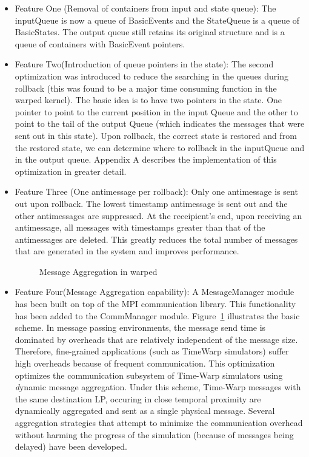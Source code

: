 \documentclass[11pt]{report}
\begin{document}
\begin{itemize}
\item Feature One (Removal of containers from input and state queue):
The inputQueue is now a queue of BasicEvents and the StateQueue is a queue
of BasicStates. The output queue still retains its original structure and
is a queue of containers with BasicEvent pointers.

\item Feature Two(Introduction of queue pointers in the state): The
second optimization was introduced to reduce the searching in the queues
during rollback (this was found to be a major time consuming function in
the {\sc warped} kernel). The basic idea is to have two pointers in the
state. One pointer to point to the current position in the input Queue and
the other to point to the tail of the output Queue (which indicates the
messages that were sent out in this state).  Upon rollback, the
correct state is restored and from the restored state, we can determine
where to rollback in the inputQueue and in the output
queue. Appendix A describes the implementation of this optimization in
greater detail.

\item Feature Three (One antimessage per rollback): Only one
antimessage is sent out upon rollback. The lowest timestamp antimessage is
sent out and the other antimessages are suppressed. At the receipient's
end, upon receiving an antimessage, all messages with timestamps greater
than that of the antimessages are deleted. This greatly reduces the total
number of messages that are generated in the system and improves
performance.

\begin{figure}
\centerline{}
\caption{Message Aggregation in {\sc warped}}\label{fig:aggregation}
\end{figure}

\item Feature Four(Message Aggregation capability): A MessageManager
module has been built on top of the MPI communication library. This
functionality has been added to the CommManager module.
Figure~\ref{fig:aggregation} illustrates the basic scheme. In message
passing environments, the message send time is dominated by overheads that
are relatively independent of the message size. Therefore, fine-grained
applications (such as TimeWarp simulators) suffer high overheads because
of frequent communication.  This optimization optimizes the communication
subsystem of Time-Warp simulators using {\emph dynamic message
aggregation}.  Under this scheme, Time-Warp messages with the same
destination LP, occuring in close temporal proximity are dynamically
aggregated and sent as a single physical message.  Several aggregation
strategies that attempt to minimize the communication overhead without
harming the progress of the simulation (because of messages being delayed)
have been developed.


\end{itemize}
\end{document}
